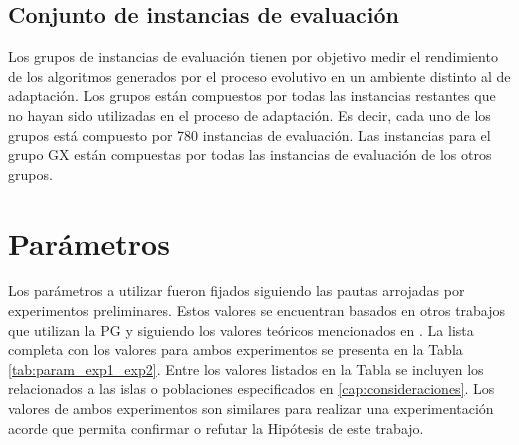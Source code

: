 \subsection{Conjunto de instancias de evaluación}

Los grupos de instancias de evaluación tienen por objetivo medir el rendimiento de los algoritmos generados por el proceso evolutivo en un ambiente distinto al de adaptación. Los grupos están compuestos por todas las instancias restantes que no hayan sido utilizadas en el proceso de adaptación. Es decir, cada uno de los grupos está compuesto por 780 instancias de evaluación. Las instancias para el grupo GX están compuestas por todas las instancias de evaluación de los otros grupos.

\section{Parámetros}

Los parámetros a utilizar fueron fijados siguiendo las pautas arrojadas por experimentos preliminares. Estos valores se encuentran basados en otros trabajos que utilizan la PG \citep{drake_2014, parada_2015, contreras_2013} y siguiendo los valores teóricos mencionados en \citep{karafotias_2015, karafotias_2014}. La lista completa con los valores para ambos experimentos se presenta en la Tabla \ref{tab:param_exp1_exp2}. Entre los valores listados en la Tabla se incluyen los relacionados a las islas o poblaciones especificados en \ref{cap:consideraciones}. Los valores de ambos experimentos son similares para realizar una experimentación acorde que permita confirmar o refutar la Hipótesis de este trabajo.

